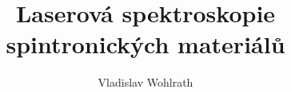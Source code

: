\documentclass{mffthesis}
\author{Vladislav Wohlrath}
\title{Laserová spektroskopie spintronických materiálů}
\begin{document}
  \maketitle

  \frontmatter
    \makedeclaration
    \makededication
    \makemetapage

  \mainmatter
    \tableofcontents

    

    

    

    \appendix
      
\end{document}
